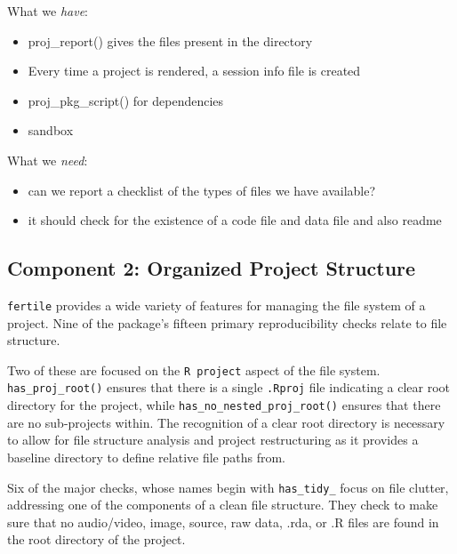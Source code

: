 \documentclass[12pt,twoside]{reedthesis}
\newenvironment{Shaded}{\begin{snugshade}}{\end{snugshade}}
\newcommand{\KeywordTok}[1]{\textcolor[rgb]{0.13,0.29,0.53}{\textbf{#1}}}
\newcommand{\DecValTok}[1]{\textcolor[rgb]{0.00,0.00,0.81}{#1}}
\newcommand{\StringTok}[1]{\textcolor[rgb]{0.31,0.60,0.02}{#1}}
\newcommand{\OperatorTok}[1]{\textcolor[rgb]{0.81,0.36,0.00}{\textbf{#1}}}
\newcommand{\NormalTok}[1]{#1}
\providecommand{\tightlist}{%
  \setlength{\itemsep}{0pt}\setlength{\parskip}{0pt}}
\begin{document}
\begin{Shaded}
\end{Shaded}
\normalsize

What we \emph{have}:
\begin{itemize}
\tightlist
\item
  proj\_report() gives the files present in the directory
\item
  Every time a project is rendered, a session info file is created
\item
  proj\_pkg\_script() for dependencies
\item
  sandbox
\end{itemize}
What we \emph{need}:
\begin{itemize}
\tightlist
\item
  can we report a checklist of the types of files we have available?
\item
  it should check for the existence of a code file and data file and
  also readme
\end{itemize}
\subsection{Component 2: Organized Project
Structure}\label{component-2-organized-project-structure}

\texttt{fertile} provides a wide variety of features for managing the
file system of a project. Nine of the package's fifteen primary
reproducibility checks relate to file structure.

Two of these are focused on the \texttt{R\ project} aspect of the file
system. \texttt{has\_proj\_root()} ensures that there is a single
\texttt{.Rproj} file indicating a clear root directory for the project,
while \texttt{has\_no\_nested\_proj\_root()} ensures that there are no
sub-projects within. The recognition of a clear root directory is
necessary to allow for file structure analysis and project restructuring
as it provides a baseline directory to define relative file paths from.

Six of the major checks, whose names begin with \texttt{has\_tidy\_}
focus on file clutter, addressing one of the components of a clean file
structure. They check to make sure that no audio/video, image, source,
raw data, .rda, or .R files are found in the root directory of the
project.
\end{document}
